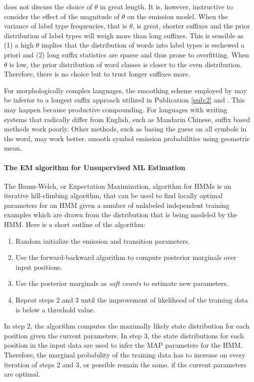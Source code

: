 \cite{Brants2000} does not discuss the choice of $\theta$ in great
length. It is, however, instructive to consider the effect of the
magnitude of $\theta$ on the emission model.  When the variance of
label type frequencies, that is $\theta$, is great, shorter suffixes
and the prior distribution of label types will weigh more than long
suffixes. This is sensible as (1) a high $\theta$ implies that the
distribution of words into label types is eschewed a priori and (2)
long suffix statistics are sparse and thus prone to overfitting. When
$\theta$ is low, the prior distribution of word classes is closer to
the even distribution. Therefore, there is no choice but to trust
longer suffixes more.

For morphologically complex languages, the smoothing scheme employed
by \cite{Brants2000} may be inferior to a longest suffix approach
utilized in Publication \ref{pub:2} and \cite{Linden2009}. This may
happen because productive compounding. For languages with writing
systems that radically differ from English, such as Mandarin Chinese,
suffix based methods work poorly. Other methods, such as basing the
guess on all symbols in the word, may work better. \cite{Huang2007}
smooth symbol emission probabilities using geometric mean.
 
\paragraph{The EM algorithm for Unsupervised ML Estimation}
The Baum-Welch, or Expectation Maximization, algorithm for HMMs is an
iterative hill-climbing algorithm, that can be used to find locally
optimal parameters for an HMM given a number of unlabeled independent
training examples which are drawn from the distribution that is being
modeled by the HMM. Here is a short outline of the algorithm:
\begin{enumerate}
\item Random initialize the emission and transition parameters.
\item Use the forward-backward algorithm to compute posterior
  marginals over input positions.
\item Use the posterior marginals as {\it soft counts} to estimate new
  parameters.
\item Repeat steps 2 and 3 until the improvement of likelihood of the
  training data is below a threshold value.
\end{enumerate}

In step 2, the algorithm computes the maximally likely state
distribution for each position given the current parameters. In step
3, the state distributions for each position in the input data are
used to infer the MAP parameters for the HMM. Therefore, the marginal
probability of the training data has to increase on every iteration of
steps 2 and 3, or possible remain the same, if the current parameters
are optimal.

